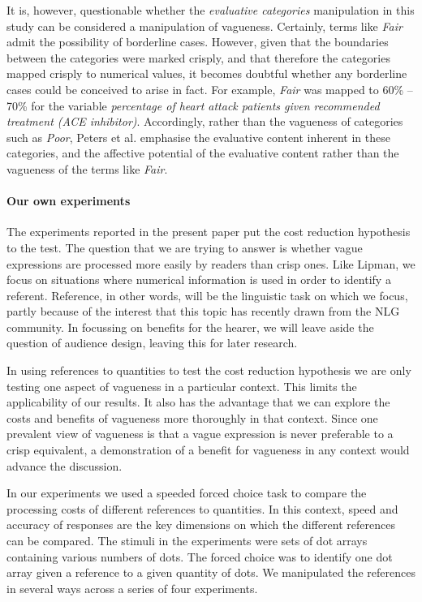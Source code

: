 It is, however, questionable whether the \emph{evaluative categories} manipulation in this study can be considered a manipulation of vagueness. Certainly, terms like \emph{Fair} admit the possibility of borderline cases. However, given that the boundaries between the categories were marked crisply, and that therefore the categories mapped crisply to numerical values, it becomes doubtful whether any borderline cases could be conceived to arise in fact. For example, \emph{Fair} was mapped to 60\% -- 70\% for the variable \emph{percentage of heart attack patients given recommended treatment (ACE inhibitor)}. Accordingly, rather than the vagueness of categories such as \emph{Poor}, Peters et al. emphasise the evaluative content inherent in these categories, and the affective potential of the evaluative content rather than the vagueness of the terms like \emph{Fair}.

\paragraph{Our own experiments}
The experiments reported in the present paper put the cost reduction hypothesis to the test. The question that we are trying to answer is whether vague expressions are processed more easily by readers than crisp ones. Like Lipman, we focus on situations where numerical information is used in order to identify a referent. Reference, in other words, will be the linguistic task on which we focus, partly because of the interest that this topic has recently drawn from the NLG community.  In focussing on benefits for the hearer, we will leave aside the question of audience design, leaving this for later research.

In using references to quantities to test the cost reduction hypothesis we are only testing one aspect of vagueness in a particular context. This limits the applicability of our results. It also has the advantage that we can explore the costs and benefits of vagueness more thoroughly in that context. Since one prevalent view of vagueness is that a vague expression is never preferable to a crisp equivalent, a demonstration of a benefit for vagueness in any context would advance the discussion.

In our experiments we used a speeded forced choice task to compare the processing costs of different references to quantities. In this context, speed and accuracy of responses are the key dimensions on which the different references can be compared. The stimuli in the experiments were sets of dot arrays containing various numbers of dots. The forced choice was to identify one dot array given a reference to a given quantity of dots. We manipulated the references in several ways across a series of four experiments. 

